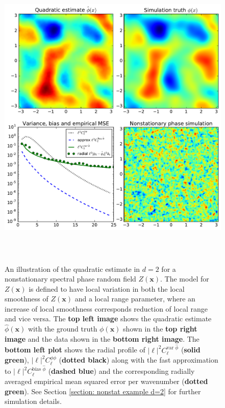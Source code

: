 \documentclass[10pt,noinfoline]{imsart}
\newcommand{\bs}{\boldsymbol}
\begin{document}
\begin{figure}
\includegraphics[height=15cm]{figure4.pdf}%
\caption{An illustration of the quadratic estimate in $d=2$ for a nonstationary spectral phase random field $Z(\bs x)$. The model for $Z(\bs x)$ is defined to have local variation in both the local smoothness of $Z(\bs x)$ and a local range parameter, where an increase of local smoothness corresponds reduction of local range and vice versa. The \textbf{top left image} shows the quadratic estimate $\hat\phi(\bs x)$ with the  ground truth $\phi(\bs x)$ shown in the \textbf{top right image} and the data shown in the \textbf{bottom right image}.  The \textbf{bottom left plot} shows the radial profile of  $|\bs \ell|^2C_{\bs \ell}^{\text{var }\hat\phi}$ (\textbf{solid green}), $|\bs \ell|^2C_{\bs \ell}^{\phi\phi}$ (\textbf{dotted black}) along with the fast approximation to $|\bs \ell|^2C_{\bs \ell}^{\text{bias }\hat\phi}$ (\textbf{dashed blue}) and the corresponding radially averaged empirical mean squared error per wavenumber (\textbf{dotted green}). See Section \ref{section: nonstat example d=2} for further simulation details.
 }
\label{Figure 3}
\end{figure}
\end{document}
